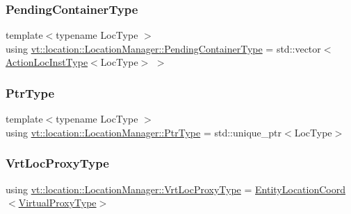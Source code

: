 \mbox{\label{structvt_1_1location_1_1_location_manager_aad005a828c535232cd6b63859b25b171}} 
\subsubsection{\texorpdfstring{Pending\+Container\+Type}{PendingContainerType}}
{\footnotesize\ttfamily template$<$typename Loc\+Type $>$ \\
using \hyperlink{structvt_1_1location_1_1_location_manager_aad005a828c535232cd6b63859b25b171}{vt\+::location\+::\+Location\+Manager\+::\+Pending\+Container\+Type} =  std\+::vector$<$\hyperlink{structvt_1_1location_1_1_location_manager_a6de3841092c537efc5fb8376128bfe18}{Action\+Loc\+Inst\+Type}$<$Loc\+Type$>$ $>$}

\mbox{\label{structvt_1_1location_1_1_location_manager_a32d8bca6ed6909a2190286408335d3b4}} 
\subsubsection{\texorpdfstring{Ptr\+Type}{PtrType}}
{\footnotesize\ttfamily template$<$typename Loc\+Type $>$ \\
using \hyperlink{structvt_1_1location_1_1_location_manager_a32d8bca6ed6909a2190286408335d3b4}{vt\+::location\+::\+Location\+Manager\+::\+Ptr\+Type} =  std\+::unique\+\_\+ptr$<$Loc\+Type$>$}

\mbox{\label{structvt_1_1location_1_1_location_manager_a3e410c85f5790a526a4eda22a9cc7881}} 
\subsubsection{\texorpdfstring{Vrt\+Loc\+Proxy\+Type}{VrtLocProxyType}}
{\footnotesize\ttfamily using \hyperlink{structvt_1_1location_1_1_location_manager_a3e410c85f5790a526a4eda22a9cc7881}{vt\+::location\+::\+Location\+Manager\+::\+Vrt\+Loc\+Proxy\+Type} =  \hyperlink{structvt_1_1location_1_1_entity_location_coord}{Entity\+Location\+Coord}$<$\hyperlink{namespacevt_a1b417dd5d684f045bb58a0ede70045ac}{Virtual\+Proxy\+Type}$>$}

